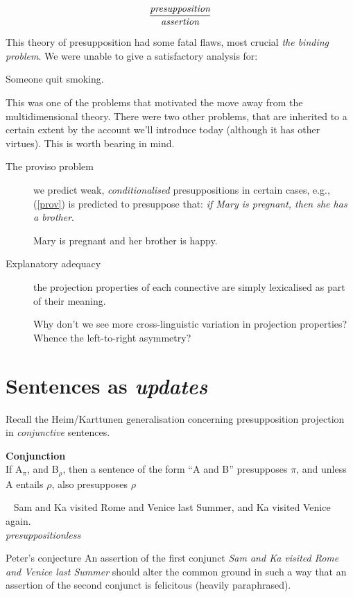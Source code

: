 \documentclass[cronos,landscape,paper=letter]{ling-handout}
\begin{document}
\[\displaystyle\frac{\text{\it presupposition}}{\text{\it assertion}}\]

This theory of presupposition had some fatal flaws, most crucial \textit{the binding problem}. We were unable to give a satisfactory analysis for:

\ex
Someone quit smoking.
\xe

This was one of the problems that motivated the move away from the multidimensional theory. There were two other problems, that are inherited to a certain extent by the account we'll introduce today (although it has other virtues). This is worth bearing in mind.

\begin{description}
  \item[The proviso problem] we predict weak, \textit{conditionalised} presuppositions in certain cases, e.g., (\ref{prov}) is predicted to presuppose that: \textit{if Mary is pregnant, then she has a brother}.

    \ex
    \label{prov}Mary is pregnant and her brother is happy.
    \xe

  \item[Explanatory adequacy] the projection properties of each connective are simply lexicalised as part of their meaning.

   Why don't we see more cross-linguistic variation in projection properties? Whence the left-to-right asymmetry?
\end{description}

\section{Sentences as \textit{updates}}

Recall the Heim/Karttunen generalisation concerning presupposition projection in \textit{conjunctive} sentences.

\ex
\textbf{Conjunction}\\If A\(_π\), and B\(_ρ\), then a sentence of the form \enquote{A and B} presupposes \(π\), and unless A entails \(ρ\), also presupposes \(ρ\)
\xe

\ex~\label{conj1}
Sam and Ka visited Rome and Venice last Summer, and Ka visited Venice again.\\
\textit{presuppositionless}
\xe

\begin{tcolorbox}
  Peter's conjecture
  \tcblower
  An assertion of the first conjunct \textit{Sam and Ka visited Rome and Venice last Summer} should alter the common ground in such a way that an assertion of the second conjunct is felicitous (heavily paraphrased).
\end{tcolorbox}
\end{document}
